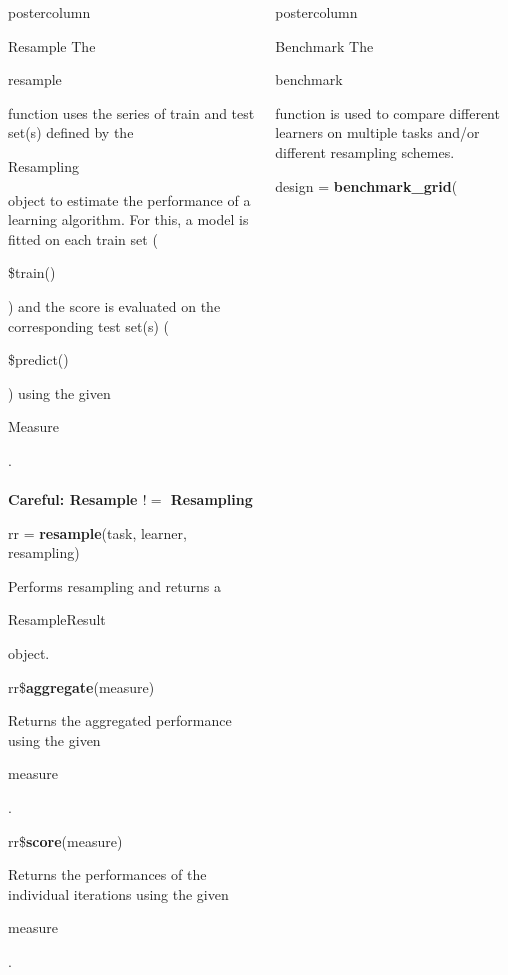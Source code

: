 \documentclass{beamer}
\newlength{\columnheight} %
\newcommand{\codeinline}[1]{\begin{codeboxinline}#1\end{codeboxinline}}
\begin{document}
\begin{withoutheader}
\begin{frame}[fragile]{}
\begin{columns}
\begin{column}{.245\textwidth}
\begin{beamercolorbox}[center]{postercolumn}
\begin{minipage}{.98\textwidth}
{						\begin{myblock}{Resample}
							The \codeinline{resample} function uses the series
							of train and test set(s) defined by the
							\codeinline{Resampling} object to estimate the
							performance of a learning algorithm. For this, a
							model is fitted on each train set
							(\codeinline{\$train()}) and the score is evaluated
							on the corresponding test set(s)
							(\codeinline{\$predict()}) using the given
							\codeinline{Measure}.
							\\
							\\
							\textbf{Careful: Resample $!=$ Resampling}
							\vspace{1em}
							\\
							\begin{codebox}
								rr = \textbf{resample}(task, learner, resampling)
							\end{codebox}
							Performs resampling and returns a \codeinline{ResampleResult} object.
							\\
							\vspace{1em}
							\begin{codebox}
								rr\$\textbf{aggregate}(measure)
							\end{codebox}
							Returns the aggregated performance using the given \codeinline{measure}.
							\\
							\begin{codebox}
								rr\$\textbf{score}(measure)
							\end{codebox}
							Returns the performances of the individual iterations using the given \codeinline{measure}.
						\end{myblock}
						\vfill
					}
				\end{minipage}
			\end{beamercolorbox}
		\end{column}
		\begin{column}{.245\textwidth}
			\begin{beamercolorbox}[center]{postercolumn}
				\begin{minipage}{.98\textwidth}
					\parbox[t][\columnheight]{\textwidth}{
						\begin{myblock}{Benchmark}
						The \codeinline{benchmark} function is used to compare different learners on multiple tasks and/or different resampling schemes.
						\\
						\begin{codeboxmultiline}[width=21.95cm]
							design = \textbf{benchmark\_grid}(\\

\end{codeboxmultiline}
\end{myblock}}
\end{minipage}
\end{beamercolorbox}
\end{column}
\end{columns}
\end{frame}
\end{withoutheader}
\end{document}
